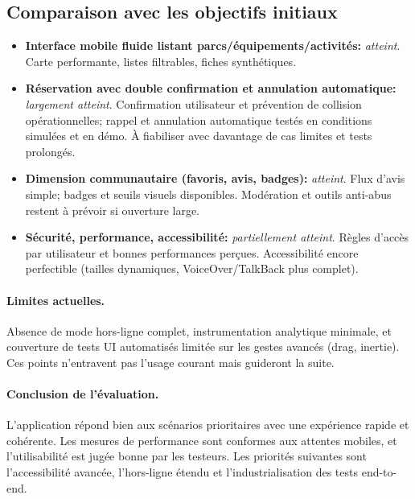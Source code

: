 \documentclass[12pt,a4paper]{article}
\begin{document}
\subsection{Comparaison avec les objectifs initiaux}

\begin{itemize}
  \item \textbf{Interface mobile fluide listant parcs/équipements/activités:} \emph{atteint}. Carte performante, listes filtrables, fiches synthétiques.
  \item \textbf{Réservation avec double confirmation et annulation automatique:} \emph{largement atteint}. Confirmation utilisateur et prévention de collision opérationnelles; rappel et annulation automatique testés en conditions simulées et en démo. À fiabiliser avec davantage de cas limites et tests prolongés.
  \item \textbf{Dimension communautaire (favoris, avis, badges):} \emph{atteint}. Flux d’avis simple; badges et seuils visuels disponibles. Modération et outils anti-abus restent à prévoir si ouverture large.
  \item \textbf{Sécurité, performance, accessibilité:} \emph{partiellement atteint}. Règles d’accès par utilisateur et bonnes performances perçues. Accessibilité encore perfectible (tailles dynamiques, VoiceOver/TalkBack plus complet).
\end{itemize}

\paragraph{Limites actuelles.}
Absence de mode hors-ligne complet, instrumentation analytique minimale, et couverture de tests UI automatisés limitée sur les gestes avancés (drag, inertie). Ces points n’entravent pas l’usage courant mais guideront la suite.

\paragraph{Conclusion de l’évaluation.}
L’application répond bien aux scénarios prioritaires avec une expérience rapide et cohérente. Les mesures de performance sont conformes aux attentes mobiles, et l’utilisabilité est jugée bonne par les testeurs. Les priorités suivantes sont l’accessibilité avancée, l’hors-ligne étendu et l’industrialisation des tests end-to-end.
\end{document}
